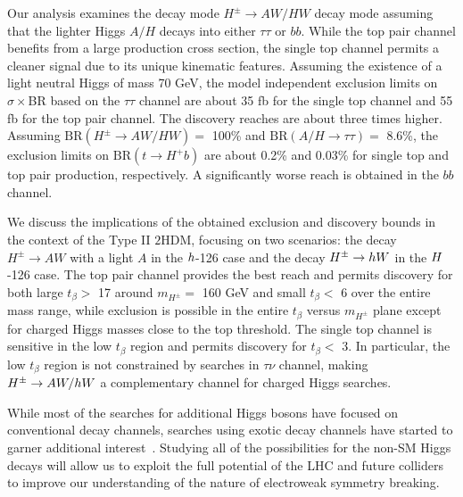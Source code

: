 Our analysis examines the decay mode $H^{\pm} \rightarrow AW/HW$ decay mode assuming that the lighter Higgs $A/H$ decays into either $\tau\tau$ or $bb$. While the top pair channel benefits from a large production cross section, the single top channel permits a cleaner signal due to its unique kinematic features. Assuming the existence of a light neutral Higgs of mass 70 GeV, the model independent exclusion limits on $\sigma\times$BR based on the $\tau\tau$ channel are about 35 fb for the single top channel and 55 fb for the top pair channel. The discovery reaches are about three times higher. Assuming $\text{BR}(H^{\pm} \rightarrow AW/HW)=$ 100\% and $\text{BR}(A/H \rightarrow \tau\tau)=$ 8.6\%, the exclusion limits on $\text{BR}(t \rightarrow H^+ b)$ are about 0.2\% and 0.03\% for single top and top pair production, respectively. A significantly worse reach is obtained in the $bb$ channel. 

We discuss the implications of the obtained exclusion and discovery bounds in the context of the Type II $2$HDM, focusing on two scenarios: the decay $H^{\pm} \rightarrow AW$ with a light $A$ in the $h$-126 case and the decay $H^{\pm} \rightarrow h W$ in the $H$-126 case.  The top pair channel provides the best reach and permits discovery for both large $t_{\beta}>$ 17 around $m_{H^{\pm}}=$ 160 GeV and small $t_{\beta}<$ 6 over the entire mass range, while exclusion is possible in the entire $t_{\beta}$ versus $m_{H^{\pm}}$ plane except for charged Higgs masses close to the top threshold. The single top channel is sensitive in the low $t_{\beta}$ region and permits discovery for $t_{\beta}<$ 3. In particular, the low $t_{\beta}$ region is not constrained by searches in $\tau\nu$ channel, making $H^{\pm} \rightarrow AW/h W$ a complementary channel for charged Higgs searches.

While most of the searches for additional Higgs bosons have focused on conventional decay channels, searches using exotic decay channels have started to garner additional interest~\cite{Curtin:2013fra, Brownson:2013lka, Coleppa:2014hxa, Coleppa:2014cca,Li:2015lra,Dorsch:2014qja,Chen:2013emb,Chen:2014dma,Enberg:2014pua,CMS:2014yra,Aad:2015wra,CMS:2013eua}. Studying all of the possibilities for the non-SM Higgs decays will allow us to exploit the full potential of the LHC and future colliders to improve our understanding of the nature of electroweak symmetry breaking.
